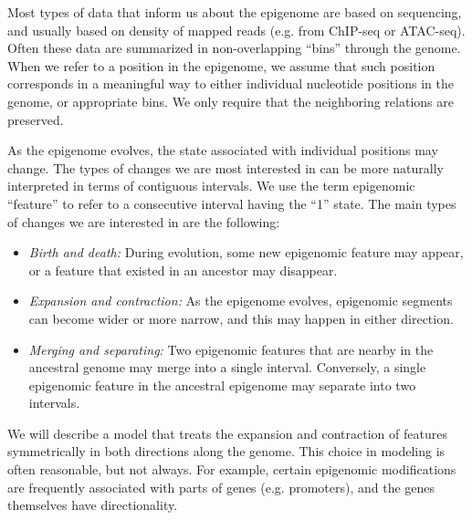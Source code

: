 \documentclass[11pt]{article}
\begin{document}
Most types of data that inform us about the epigenome are based on
sequencing, and usually based on density of mapped reads (e.g. from
ChIP-seq or ATAC-seq). Often these data are summarized in
non-overlapping ``bins'' through the genome. When we refer to a
position in the epigenome, we assume that such position corresponds in
a meaningful way to either individual nucleotide positions
in the genome, or appropriate bins. We only require that the
neighboring relations are preserved.


As the epigenome evolves, the state associated with individual
positions may change. The types of changes we are most interested in
can be more naturally interpreted in terms of contiguous intervals. We
use the term epigenomic ``feature'' to refer to a consecutive interval
having the ``1'' state. The main types of changes we are interested in
are the following:
\begin{itemize}
\item {\it Birth and death:} During evolution, some new epigenomic
  feature may appear, or a feature that existed in an ancestor may
  disappear. %
\item {\it Expansion and contraction:} As the epigenome evolves,
  epigenomic segments can become wider or more narrow, and this may
  happen in either direction.
\item {\it Merging and separating:} Two epigenomic features that are
  nearby in the ancestral genome may merge into a single interval.
  Conversely, a single epigenomic feature in the ancestral epigenome
  may separate into two intervals.
\end{itemize}
We will describe a model that treats the expansion and contraction of
features symmetrically in both directions along the genome.  This
choice in modeling is often reasonable, but not always. For example,
certain epigenomic modifications are frequently associated with parts
of genes (e.g. promoters), and the genes themselves have
directionality.
\end{document}
